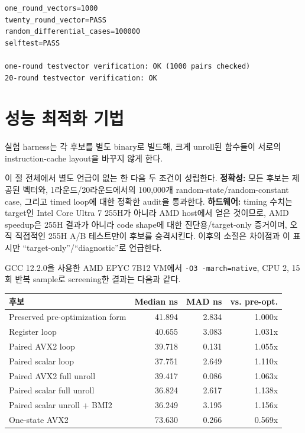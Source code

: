 \documentclass[11pt,a4paper]{article}
\begin{document}
\begin{lstlisting}
one_round_vectors=1000
twenty_round_vector=PASS
random_differential_cases=100000
selftest=PASS

one-round testvector verification: OK (1000 pairs checked)
20-round testvector verification: OK
\end{lstlisting}

\section{성능 최적화 기법}
\label{sec:candidates}

실험 harness는 각 후보를 별도 binary로 빌드해, 크게 unroll된 함수들이
서로의 instruction-cache layout을 바꾸지 않게 한다.

이 절 전체에서 별도 언급이 없는 한 다음 두 조건이 성립한다.
\textbf{정확성:} 모든 후보는 제공된 벡터와, 1라운드/20라운드에서의
100,000개 random-state/random-constant case, 그리고 timed loop에 대한
정확한 audit을 통과한다.
\textbf{하드웨어:} timing 수치는 target인 Intel Core Ultra 7 255H가
아니라 AMD host에서 얻은 것이므로, AMD speedup은 255H 결과가 아니라
code shape에 대한 진단용/target-only 증거이며, 오직 직접적인 255H A/B
테스트만이 후보를 승격시킨다.  이후의 소절은 차이점과 이 표시만
``target-only''/``diagnostic''로 언급한다.

GCC 12.2.0을 사용한 AMD EPYC 7B12 VM에서 \texttt{-O3 -march=native},
CPU 2, 15회 반복 sample로 screening한 결과는 다음과 같다.

\begin{center}
\begin{tabular}{lrrr}
\toprule
후보 & Median ns & MAD ns & vs. pre-opt. \\
\midrule
Preserved pre-optimization form & 41.894 & 2.834 & 1.000x \\
Register loop                  & 40.655 & 3.083 & 1.031x \\
Paired AVX2 loop               & 39.718 & 0.131 & 1.055x \\
Paired scalar loop             & 37.751 & 2.649 & 1.110x \\
Paired AVX2 full unroll        & 39.417 & 0.086 & 1.063x \\
Paired scalar full unroll      & 36.824 & 2.617 & 1.138x \\
Paired scalar unroll + BMI2    & 36.249 & 3.195 & 1.156x \\
One-state AVX2                 & 73.630 & 0.266 & 0.569x \\
\bottomrule
\end{tabular}
\end{center}
\end{document}
